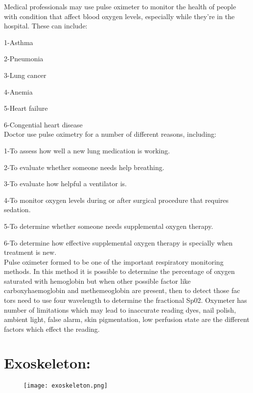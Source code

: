 \documentclass[a4paper,12pt]{article}
\begin{document}
Medical professionals may use pulse oximeter to monitor the health of people with condition that affect blood oxygen levels, especially while they’re
in the hospital. These can include:

1-Asthma

2-Pneumonia 

3-Lung cancer


4-Anemia

5-Heart failure 

6-Congential heart disease
\\


Doctor use pulse oximetry for a number of different reasons, including:

1-To assess how well a new lung medication is working.

2-To evaluate whether someone needs help breathing.

3-To evaluate how helpful a ventilator is.

4-To monitor oxygen levels during or after surgical procedure that requires
sedation.

5-To determine whether someone needs supplemental oxygen therapy.

6-To determine how effective supplemental oxygen therapy is specially
when treatment is new.
\\

Pulse oximeter formed to be one of the important respiratory monitoring methods. In this method it is possible to determine the percentage of oxygen saturated with hemoglobin but when other possible factor like carboxyhaemoglobin and methemeoglobin are present, then to detect those fac tors need to use four wavelength to determine the fractional Sp02. Oxymeter has number of limitations which may lead to inaccurate reading  dyes, nail polish, ambient light, false alarm, skin pigmentation, low perfusion state are the different
factors which effect the reading. 
\clearpage

\large
\section{Exoskeleton:} 
\begin{figure}[h]
	\texttt{[image: exoskeleton.png]}
\end{figure} 
\end{document}
